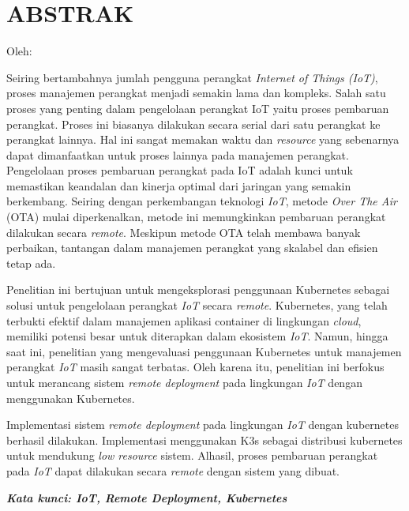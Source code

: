 \clearpage
\chapter*{ABSTRAK}
\begin{center}
  \center
  \begin{singlespace}
    \large\bfseries\MakeUppercase{\thetitle}
    
    \normalfont\normalsize
    Oleh:
    
    \bfseries \theauthor
  \end{singlespace}
\end{center}

\begin{singlespace}
  \small
  Seiring bertambahnya jumlah pengguna perangkat \textit{Internet of Things (IoT)}, proses manajemen perangkat menjadi semakin lama dan kompleks. Salah satu proses yang penting dalam pengelolaan perangkat IoT yaitu proses pembaruan perangkat. Proses ini biasanya dilakukan secara serial dari satu perangkat ke perangkat lainnya. Hal ini sangat memakan waktu dan \textit{resource} yang sebenarnya dapat dimanfaatkan untuk proses lainnya pada manajemen perangkat. Pengelolaan proses pembaruan perangkat pada IoT adalah kunci untuk memastikan keandalan dan kinerja optimal dari jaringan yang semakin berkembang. Seiring dengan perkembangan teknologi \textit{IoT}, metode \textit{Over The Air} (OTA) mulai diperkenalkan, metode ini memungkinkan pembaruan perangkat dilakukan secara \textit{remote}. Meskipun metode OTA telah membawa banyak perbaikan, tantangan dalam manajemen perangkat yang skalabel dan efisien tetap ada.
  
  Penelitian ini bertujuan untuk mengeksplorasi penggunaan Kubernetes sebagai solusi untuk pengelolaan perangkat \textit{IoT} secara \textit{remote}. Kubernetes, yang telah terbukti efektif dalam manajemen aplikasi container di lingkungan \textit{cloud}, memiliki potensi besar untuk diterapkan dalam ekosistem \textit{IoT}. Namun, hingga saat ini, penelitian yang mengevaluasi penggunaan Kubernetes untuk manajemen perangkat \textit{IoT} masih sangat terbatas. Oleh karena itu, penelitian ini berfokus untuk merancang sistem \textit{remote deployment} pada lingkungan \textit{IoT} dengan menggunakan Kubernetes.
  
  Implementasi sistem \textit{remote deployment} pada lingkungan \textit{IoT} dengan kubernetes berhasil dilakukan. Implementasi menggunakan K3s sebagai distribusi kubernetes untuk mendukung \textit{low resource} sistem.  Alhasil, proses pembaruan perangkat pada \textit{IoT} dapat dilakukan secara \textit{remote} dengan sistem yang dibuat.
  
  \textbf{\textit{Kata kunci: IoT, Remote Deployment, Kubernetes }}
  
\end{singlespace}
\clearpage